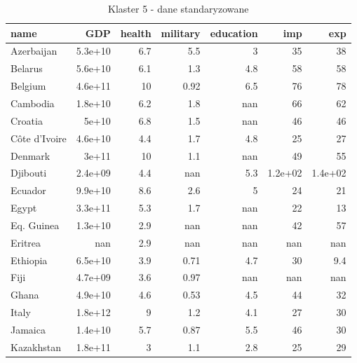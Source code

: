 \begin{table}
    \centering
    \caption{Klaster 5 - dane standaryzowane}
    \label{tab:cl5std}
    \begin{tabular}{lrrrrrr}
        \toprule
        name          & GDP     & health & military & education & imp     & exp     \\
        \midrule
        Azerbaijan    & 5.3e+10 & 6.7    & 5.5      & 3         & 35      & 38      \\
        Belarus       & 5.6e+10 & 6.1    & 1.3      & 4.8       & 58      & 58      \\
        Belgium       & 4.6e+11 & 10     & 0.92     & 6.5       & 76      & 78      \\
        Cambodia      & 1.8e+10 & 6.2    & 1.8      & nan       & 66      & 62      \\
        Croatia       & 5e+10   & 6.8    & 1.5      & nan       & 46      & 46      \\
        Côte d'Ivoire & 4.6e+10 & 4.4    & 1.7      & 4.8       & 25      & 27      \\
        Denmark       & 3e+11   & 10     & 1.1      & nan       & 49      & 55      \\
        Djibouti      & 2.4e+09 & 4.4    & nan      & 5.3       & 1.2e+02 & 1.4e+02 \\
        Ecuador       & 9.9e+10 & 8.6    & 2.6      & 5         & 24      & 21      \\
        Egypt         & 3.3e+11 & 5.3    & 1.7      & nan       & 22      & 13      \\
        Eq. Guinea    & 1.3e+10 & 2.9    & nan      & nan       & 42      & 57      \\
        Eritrea       & nan     & 2.9    & nan      & nan       & nan     & nan     \\
        Ethiopia      & 6.5e+10 & 3.9    & 0.71     & 4.7       & 30      & 9.4     \\
        Fiji          & 4.7e+09 & 3.6    & 0.97     & nan       & nan     & nan     \\
        Ghana         & 4.9e+10 & 4.6    & 0.53     & 4.5       & 44      & 32      \\
        Italy         & 1.8e+12 & 9      & 1.2      & 4.1       & 27      & 30      \\
        Jamaica       & 1.4e+10 & 5.7    & 0.87     & 5.5       & 46      & 30      \\
        Kazakhstan    & 1.8e+11 & 3      & 1.1      & 2.8       & 25      & 29      \\

\end{tabular}
\end{table}
